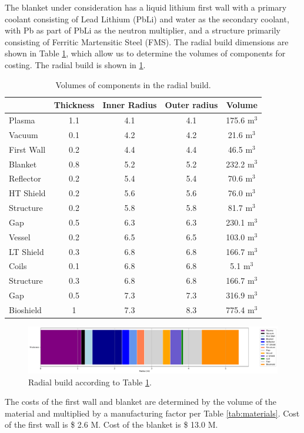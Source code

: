 The blanket under consideration has a liquid lithium first wall with a primary coolant consisting of Lead Lithium (PbLi) and water as the secondary coolant, with Pb as part of PbLi as the neutron multiplier, and a structure primarily consisting of Ferritic Martensitic Steel (FMS). The radial build dimensions are shown in Table \ref{tab:volumes}, which allow us to determine the volumes of components for costing.  The radial build is shown in \ref{fig:radial}.  \\


\begin{table}[h!]
    \centering
    \begin{tabular}{l c  c c c}
    \hline
        &	Thickness	&	Inner Radius	&	Outer radius	&	Volume		\\
        \hline
Plasma	&	1.1	&	4.1	&	4.1	&	175.6	m$^{3}$	\\
Vacuum	&	0.1	&	4.2	&	4.2	&	21.6	m$^{3}$	\\
First Wall	&	0.2	&	4.4	&	4.4	&	46.5	m$^{3}$	\\
Blanket	&	0.8	&	5.2	&	5.2	&	232.2	m$^{3}$	\\
Reflector	&	0.2	&	5.4	&	5.4	&	70.6	m$^{3}$	\\
HT Shield	&	0.2	&	5.6	&	5.6	&	76.0	m$^{3}$	\\
Structure	&	0.2	&	5.8	&	5.8	&	81.7	m$^{3}$	\\
Gap	&	0.5	&	6.3	&	6.3	&	230.1	m$^{3}$	\\
Vessel	&	0.2	&	6.5	&	6.5	&	103.0	m$^{3}$	\\
LT Shield	&	0.3	&	6.8	&	6.8	&	166.7	m$^{3}$	\\
Coils	&	0.1	&	6.8	&	6.8	&	5.1	m$^{3}$	\\
Structure	&	0.3	&	6.8	&	6.8	&	166.7	m$^{3}$	\\
Gap	&	0.5	&	7.3	&	7.3	&	316.9	m$^{3}$	\\
Bioshield	&	1	&	7.3	&	8.3	&	775.4	m$^{3}$	\\

        \hline
    \end{tabular}
    \caption{Volumes of components in the radial build.}
    \label{tab:volumes}
\end{table}

\begin{figure}
    \centering
    \includegraphics[width=0.9\linewidth]{Figures/radial_build.pdf}
    \caption{Radial build according to Table \ref{tab:volumes}.}
    \label{fig:radial}
\end{figure}



The costs of the first wall and blanket are determined by the volume of the material and multiplied by a manufacturing factor per Table \ref{tab:materials}.   Cost of the first wall is \$ 2.6 M.  Cost of the blanket is \$ 13.0 M.

